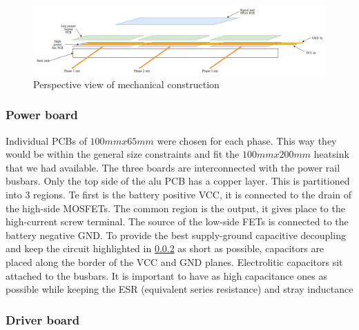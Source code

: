 \begin{figure}[H]
	\centering
	\includegraphics[width=1\textwidth]{pictures/hardware/Power_Board/mechanical_persp_new.png}
	\caption{Perspective view of mechanical construction}
	\label{fig:mech_persp}
\end{figure}

\subsubsection{Power board}

Individual PCBs of $100mm x 65mm$ were chosen for each phase. This way they would be within the general size constraints and fit the $100mm x 200mm$ heatsink that we had available. The three boards are interconnected with the power rail busbars. Only the top side of the alu PCB has a copper layer. This is partitioned into 3 regions. Te first is the battery positive VCC, it is connected to the drain of the high-side MOSFETs. The common region is the output, it gives place to the high-current screw terminal. The source of the low-side FETs is connected to the battery negative GND. To provide the best supply-ground capacitive decoupling and keep the circuit highlighted in \ref{} as short as possible, capacitors are placed along the border of the VCC and GND planes. Electrolitic capacitors sit attached to the busbars. It is important to have as high capacitance ones as possible while keeping the ESR (equivalent series resistance) and stray inductance

\subsubsection{Driver board}